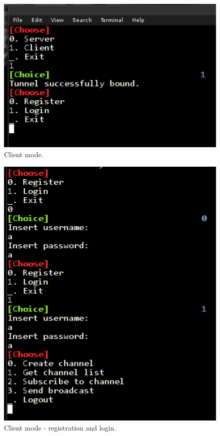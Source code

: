 \documentclass[11pt]{report}
\newcommand{\+}{\discretionary{\mbox{\scriptsize$\hookleftarrow$}}{}{}}
\begin{document}
            \begin{figure}[!htb]
            \caption{Client mode.}
            \centering
            \includegraphics[width=1\textwidth]{screens/1.png}
            \end{figure}


            \begin{figure}[!htb]
            \caption{Client mode - registration and login.}
            \centering
            \includegraphics[width=1\textwidth]{screens/2.png}
            \end{figure}
\end{document}
